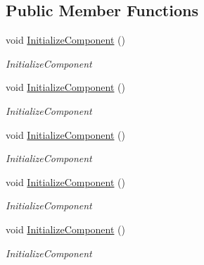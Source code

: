 \subsection*{Public Member Functions}
\begin{DoxyCompactItemize}
\item 
void \mbox{\hyperlink{class_teacher_handbook_1_1_plugins_1_1_feed_1_1_feed_af30cfc1a3c7dc2b1874970fbc721113d}{Initialize\+Component}} ()
\begin{DoxyCompactList}\small\item\em Initialize\+Component \end{DoxyCompactList}\item 
void \mbox{\hyperlink{class_teacher_handbook_1_1_plugins_1_1_feed_1_1_feed_af30cfc1a3c7dc2b1874970fbc721113d}{Initialize\+Component}} ()
\begin{DoxyCompactList}\small\item\em Initialize\+Component \end{DoxyCompactList}\item 
void \mbox{\hyperlink{class_teacher_handbook_1_1_plugins_1_1_feed_1_1_feed_af30cfc1a3c7dc2b1874970fbc721113d}{Initialize\+Component}} ()
\begin{DoxyCompactList}\small\item\em Initialize\+Component \end{DoxyCompactList}\item 
void \mbox{\hyperlink{class_teacher_handbook_1_1_plugins_1_1_feed_1_1_feed_af30cfc1a3c7dc2b1874970fbc721113d}{Initialize\+Component}} ()
\begin{DoxyCompactList}\small\item\em Initialize\+Component \end{DoxyCompactList}\item 
void \mbox{\hyperlink{class_teacher_handbook_1_1_plugins_1_1_feed_1_1_feed_af30cfc1a3c7dc2b1874970fbc721113d}{Initialize\+Component}} ()
\begin{DoxyCompactList}\small\item\em Initialize\+Component \end{DoxyCompactList}\end{DoxyCompactItemize}
